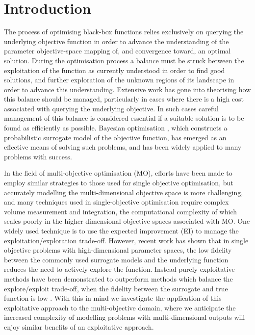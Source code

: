 \documentclass[conference]{IEEEtran}
\newcommand\ei{EI\xspace}
\begin{document}
\section{Introduction}
The process of optimising black-box functions relies exclusively on querying the underlying objective function in order to advance the understanding of the parameter objective-space mapping of, and convergence toward, an optimal solution. During the optimisation process a balance must be struck between the exploitation of the function as currently understood in order to find good solutions, and further exploration of the unknown regions of its landscape in order to advance this understanding. Extensive work has gone into theorising how this balance should be managed, particularly in cases where there is a high cost associated with querying the underlying objective. In such cases careful management of this balance is considered essential if a suitable solution is to be found as efficiently as possible. Bayesian optimisation \cite{jones1998efficient}, which constructs a probabilistic surrogate model of the objective function, has emerged as an effective means of solving such problems, and has been widely applied to many problems with success.

In the field of multi-objective optimisation (MO), efforts have been made to employ similar strategies to those used for single objective optimisation, but accurately modelling the multi-dimensional objective space is more challenging, and many techniques used in single-objective optimisation require complex volume measurement and integration, the computational complexity of which scales poorly in the higher dimensional objective spaces associated with MO. One widely used technique is to use the expected improvement (\ei)  \cite{jones1998efficient} to manage the exploitation/exploration trade-off. However, recent work has shown that in single objective problems with high-dimensional parameter spaces, the low fidelity between the commonly used surrogate models and the underlying function reduces the need to actively explore the function. Instead purely exploitative methods have been demonstrated to outperform methods which balance the explore/exploit trade-off, when the fidelity between the surrogate and true function is low \cite{death2019greed}. With this in mind we investigate the application of  this exploitative approach to the multi-objective domain, where we anticipate the increased complexity of modelling problems with multi-dimensional outputs will enjoy similar benefits of an exploitative approach. 
\end{document}
